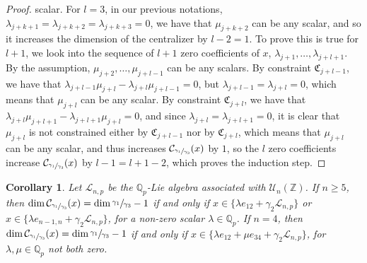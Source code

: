 \documentclass[12pt]{article}
\newtheorem{corollary}[theorem]{Corollary}
\begin{document}
\begin{proof}
scalar. For $l=3$, in our previous notations, $\lambda_{j+k+1}=\lambda_{j+k+2}=\lambda_{j+k+3}=0$, we have that $\mu_{j+k+2}$ can be any scalar, and so it increases the dimension of the centralizer by $l-2=1$. To prove this is true for $l+1$, we look into the sequence of $l+1$ zero coefficients of $x$, $\lambda_{j+1},\dots,\lambda_{j+l+1}$. By the assumption, $\mu_{j+2},\dots,\mu_{j+l-1}$ can be any scalars. By constraint $\mathfrak{C}_{j+l-1}$, we have that $\lambda_{j+l-1}\mu_{j+l}-\lambda_{j+l}\mu_{j+l-1}=0$, but $\lambda_{j+l-1}=\lambda_{j+l}=0$, which means that $\mu_{j+l}$ can be any scalar. By constraint $\mathfrak{C}_{j+l}$, we have that $\lambda_{j+l}\mu_{j+l+1}-\lambda_{j+l+1}\mu_{j+l}=0$, and since $\lambda_{j+l}=\lambda_{j+l+1}=0$, it is clear that $\mu_{j+l}$ is not constrained either by $\mathfrak{C}_{j+l-1}$ nor by $\mathfrak{C}_{j+l}$, which means that $\mu_{j+l}$ can be any scalar, and thus increases $\mathcal{C}_{\sfrac{\gamma_1}{\gamma_3}}(x)$ by $1$, so the $l$ zero coefficients increase $\mathcal{C}_{\sfrac{\gamma_1}{\gamma_3}}(x)$ by $l-1=l+1-2$, which proves the induction step.
\end{proof}
\begin{corollary}
\label{prop.n.geq.4.centralizer.codimension}
Let $\mathcal{L}_{n,p}$ be the $\mathbb{Q}_p$-Lie algebra associated with $\mathcal{U}_n(\mathbb{Z})$. If $n\geq 5$, then $\dim\mathcal{C}_{\sfrac{\gamma_1}{\gamma_3}}(x)=\dim\sfrac{\gamma_1}{\gamma_3}-1$ if and only if $x\in\{\lambda e_{12}+\gamma_2\mathcal{L}_{n,p}\}$ or $x\in\{\lambda e_{n-1,n}+\gamma_2\mathcal{L}_{n,p}\}$, for a non-zero scalar $\lambda\in\mathbb{Q}_p$. If $n=4$, then $\dim\mathcal{C}_{\sfrac{\gamma_1}{\gamma_3}}(x)=\dim\sfrac{\gamma_1}{\gamma_3}-1$ if and only if $x\in\{\lambda e_{12}+\mu e_{34}+\gamma_2\mathcal{L}_{n,p}\}$, for $\lambda,\mu\in\mathbb{Q}_p$ not both zero.
\end{corollary}
\end{document}
